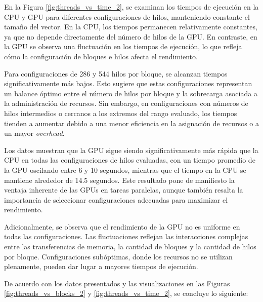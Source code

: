 \documentclass{article}
\begin{document}
			En la Figura \ref{fig:threads_vs_time_2}, se examinan los tiempos de ejecución en la CPU y GPU para diferentes configuraciones de hilos, manteniendo constante el tamaño del vector. En la CPU, los tiempos permanecen relativamente constantes, ya que no depende directamente del número de hilos de la GPU. En contraste, en la GPU se observa una fluctuación en los tiempos de ejecución, lo que refleja cómo la configuración de bloques e hilos afecta el rendimiento.

			Para configuraciones de 286 y 544 hilos por bloque, se alcanzan tiempos significativamente más bajos. Esto sugiere que estas configuraciones representan un balance óptimo entre el número de hilos por bloque y la sobrecarga asociada a la administración de recursos. Sin embargo, en configuraciones con números de hilos intermedios o cercanos a los extremos del rango evaluado, los tiempos tienden a aumentar debido a una menor eficiencia en la asignación de recursos o a un mayor \textit{overhead}.

			Los datos muestran que la GPU sigue siendo significativamente más rápida que la CPU en todas las configuraciones de hilos evaluadas, con un tiempo promedio de la GPU oscilando entre 6 y 10 segundos, mientras que el tiempo en la CPU se mantiene alrededor de 14.5 segundos. Este resultado pone de manifiesto la ventaja inherente de las GPUs en tareas paralelas, aunque también resalta la importancia de seleccionar configuraciones adecuadas para maximizar el rendimiento.

			Adicionalmente, se observa que el rendimiento de la GPU no es uniforme en todas las configuraciones. Las fluctuaciones reflejan las interacciones complejas entre las transferencias de memoria, la cantidad de bloques y la cantidad de hilos por bloque. Configuraciones subóptimas, donde los recursos no se utilizan plenamente, pueden dar lugar a mayores tiempos de ejecución.

			De acuerdo con los datos presentados y las visualizaciones en las Figuras \ref{fig:threads_vs_blocks_2} y \ref{fig:threads_vs_time_2}, se concluye lo siguiente:
\end{document}
